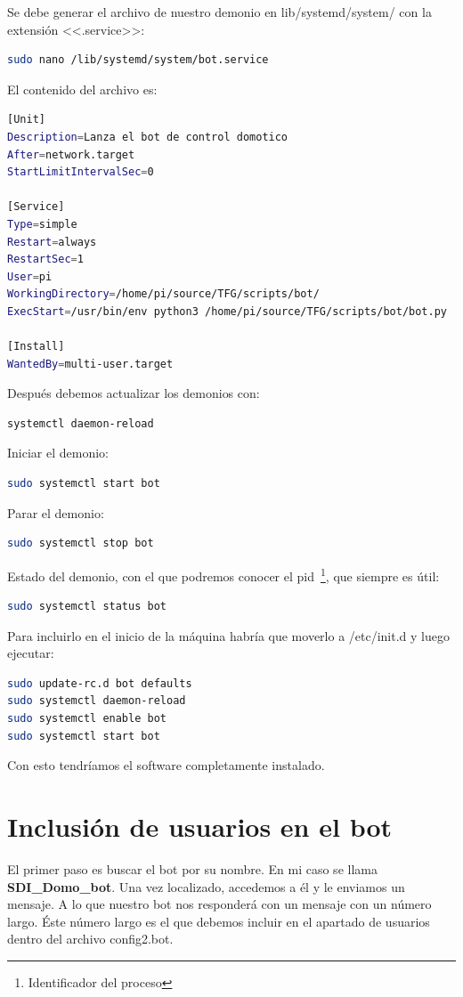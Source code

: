 Se debe generar el archivo de nuestro demonio en lib/systemd/system/ con la extensión <<.service>>:
\begin{lstlisting}[language=sh, firstnumber=0]
sudo nano /lib/systemd/system/bot.service
\end{lstlisting}
El contenido del archivo es:
\begin{lstlisting}[language=sh, caption={Modificaciones en el archivo /lib/systemd/system/bot.service.}, firstnumber=0]
[Unit]
Description=Lanza el bot de control domotico
After=network.target
StartLimitIntervalSec=0

[Service]
Type=simple
Restart=always
RestartSec=1
User=pi
WorkingDirectory=/home/pi/source/TFG/scripts/bot/
ExecStart=/usr/bin/env python3 /home/pi/source/TFG/scripts/bot/bot.py

[Install]
WantedBy=multi-user.target
\end{lstlisting}
Después debemos actualizar los demonios con: 
\begin{lstlisting}[language=sh, firstnumber=0]
systemctl daemon-reload
\end{lstlisting}
Iniciar el demonio: 
\begin{lstlisting}[language=sh, firstnumber=0]
sudo systemctl start bot
\end{lstlisting}
Parar el demonio: 
\begin{lstlisting}[language=sh, firstnumber=0]
sudo systemctl stop bot
\end{lstlisting}
Estado del demonio, con el que podremos conocer el pid~\footnote{Identificador del proceso}, que siempre es útil: 
\begin{lstlisting}[language=sh, firstnumber=0]
sudo systemctl status bot
\end{lstlisting}

Para incluirlo en el inicio de la máquina habría que moverlo a /etc/init.d y luego ejecutar: 
\begin{lstlisting}[language=sh, firstnumber=0]    
sudo update-rc.d bot defaults
sudo systemctl daemon-reload
sudo systemctl enable bot
sudo systemctl start bot
\end{lstlisting}  

Con esto tendríamos el software completamente instalado.

\section{Inclusión de usuarios en el bot}
El primer paso es buscar el bot por su nombre. En mi caso se llama \textbf{SDI\_Domo\_bot}.
Una vez localizado, accedemos a él y le enviamos un mensaje. A lo que nuestro bot nos responderá con un mensaje con un número largo. Éste número largo es el que debemos incluir en el apartado de usuarios dentro del archivo config2.bot.

